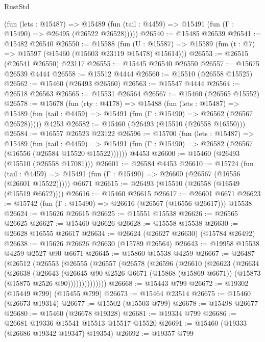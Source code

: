 \begin{lexlean}{RustStd}
\begin{coremodule}
      (fun (lets : @15487) =>
      @15489 (fun (tail : @4459) => @15491 (fun (Γ : @15490) => @26495 (@26522 @26528)))))
@26540 := @15485 @26539
@26541 := @15482 @26540
@26550 := @15588
    (fun (U : @15587) => @15589 (fun (t : @7) => @15597 (@15460 (@15603 @23119 @15478) @15614)))
@26553 := @26515 (@26541 @26550) @23117
@26555 := @15445 @26540 @26550
@26557 := @15675 @26539 @4444
@26558 := @15512 @4444
@26560 := @15510 (@26558 @15525)
@26562 := @15460 (@26493 @26560)
@26563 := @15547 @4444
@26564 := @26518 @26563
@26565 := @15531 @26564
@26567 := @15460 (@26565 @15552)
@26578 := @15678
    (fun (rty : @4178) =>
    @15488
      (fun (lets : @15487) =>
      @15489 (fun (tail : @4459) => @15491 (fun (Γ : @15490) => @26562 (@26567 @26528)))))
    @4253
@26582 := @15460 (@26493 (@15510 (@26558 @16550)))
@26584 := @16557 @26523 @23122
@26596 := @15700
    (fun (lets : @15487) =>
    @15489
      (fun (tail : @4459) =>
      @15491 (fun (Γ : @15490) => @26582 (@26567 (@16556 (@26584 @15520 @15522))))))
    @4453
@26600 := @15460 (@26493 (@15510 (@26558 @17081)))
@26601 := @26584 @4453
@26610 := @15724
    (fun (tail : @4459) => @15491 (fun (Γ : @15490) => @26600 (@26567 (@16556 (@26601 @15522)))))
    @6671
@26615 := @26493 (@15510 (@26558 (@16549 (@15519 @6672))))
@26616 := @15460 @26615
@26617 := @26601 @6671
@26623 := @15742 (fun (Γ : @15490) => @26616 (@26567 (@16556 @26617))) @15538
@26624 := @15626 @26615
@26625 := @15551 @15538
@26626 := @26565 @26625
@26627 := @15460 @26626
@26628 := @15558 @15538
@26630 := @26628 @16555 @26617
@26634 := @26624 (@26627 @26630) (@15784 @26492)
@26638 := @15626 @26626 @26630 (@15789 @26564)
@26643 := @19958 @15538 @4259 @2527 @90 @6671
@26645 := @15860 @15538 @4259
@26667 := @26487
    (@26512
      (@26553
        (@26555
          (@26557
            (@26578
              (@26596
                (@26610
                  (@26623
                    (@26634
                      (@26638
                        (@26643
                          (@26645
                            @90
                            @2526
                            @6671
                            (@15868 (@15869 @6671))
                            (@15873 (@15875 @2526 @90))))))))))))))
@26668 := @15443 @799
@26672 := @19302 (@15449 @799) (@15455 @799)
@26673 := @15464 @23514
@26675 := @15460 (@26673 @19314)
@26677 := @15502 (@15503 @799)
@26678 := @15498 @26677
@26680 := @15460 (@26678 @19328)
@26681 := @19334 @799
@26686 := @26681 @19336 @15541 @15513 @15517 @15520
@26691 := @15460 (@19333 (@26686 @19342 @19347) @19354)
@26692 := @19357 @799

\end{coremodule}
\end{lexlean}
